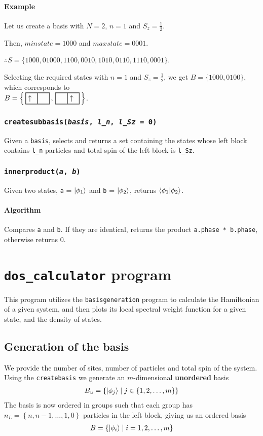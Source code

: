 \documentclass[]{book}
\newcommand{\up}{\fbox{$\mathord\uparrow\phantom{\downarrow}$}}%
\newcommand{\emp}{\fbox{$\phantom{\downarrow}\phantom{\downarrow}$}}%
\newcommand{\electron}[2]{{%
		\setlength\tabcolsep{0pt}%
		\begin{tabular}{c}
			\fboxsep=0pt\fbox{\fboxsep=3pt#2}\\[2pt]
			#1
		\end{tabular}%
}}
\begin{document}
\subsubsection*{Example}
Let us create a basis with $N=2$, $n=1$ and $S_z = \frac{1}{2}$.

Then, $ minstate = 1000 $ and $ maxstate = 0001 $.

$\therefore S = \{ 1000, 01000, 1100, 0010, 1010, 0110, 1110, 0001 \}$.

Selecting the required states with $n=1$ and $S_z=\frac{1}{2}$, we get $B = \{ 1000, 0100 \}$, which corresponds to\\
$B= \left\{\, \mathrm{\electron{}{\up \emp}\, , \,\electron{}{\emp \up }}\, \right\}$.

\subsection{\texttt{createsubbasis(\textit{basis}, \textit{l\_n}, \textit{l\_Sz} = 0)}}
Given a \texttt{basis}, selects and returns a set containing the states whose left block contains \texttt{l\_n} particles and total spin of the left block is \texttt{l\_Sz}.

\subsection{\texttt{innerproduct(\textit{a}, \textit{b})}}
Given two states, \texttt{a} = $ \ket{\phi_1} $ and \texttt{b} = $ \ket{\phi_2} $, returns $ \ip{\phi_1}{\phi_2} $.

\subsubsection{Algorithm}
Compares \texttt{a} and \texttt{b}. If they are identical, returns the product \texttt{a.phase * b.phase}, otherwise returns 0.

\chapter{\texttt{dos\_calculator} program}
This program utilizes the \texttt{basisgeneration} program to calculate the Hamiltonian of a given system, and then plots its local spectral weight function for a given state, and the density of states.

\section{Generation of the basis}
We provide the number of sites, number of particles and total spin of the system. Using the \texttt{createbasis} we generate an $m$-dimensional \textbf{unordered} basis
\begin{align}
B_u = \left\{ \ket{\phi_j} \mid j \in \left\{1,2,\ldots,m\right\} \right\}
\end{align}
The basis is now ordered in groups such that each group has $n_L = \left\{ n, n-1, \ldots, 1, 0 \right\}$ particles in the left block, giving us an ordered basis
\begin{align}
B = \left\{ \ket{\phi_i} \mid i = 1,2,\ldots,m \right\}
\end{align}
\end{document}
